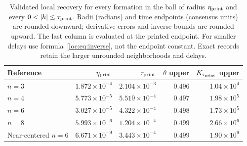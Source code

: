 \begin{table}[htbp]
\centering\small
\setlength{\tabcolsep}{5pt}
\begin{tabular}{lrrrr}
\toprule
Reference & $\eta_{\rm print}$ & $\tau_{\rm print}$ & $\theta$ upper & $K_{\tau_{\rm print}}$ upper \\
\midrule
$n=3$ & $1.872\times10^{-4}$ & $2.104\times10^{-3}$ & $0.496$ & $1.04\times10^{4}$ \\
$n=4$ & $5.773\times10^{-5}$ & $5.519\times10^{-4}$ & $0.497$ & $1.98\times10^{5}$ \\
$n=6$ & $3.027\times10^{-5}$ & $4.322\times10^{-4}$ & $0.498$ & $1.73\times10^{5}$ \\
$n=8$ & $5.993\times10^{-6}$ & $1.204\times10^{-4}$ & $0.499$ & $2.66\times10^{6}$ \\
Near-centered $n=6$ & $6.671\times10^{-9}$ & $3.443\times10^{-4}$ & $0.499$ & $1.90\times10^{9}$ \\
\bottomrule
\end{tabular}
\caption{Validated local recovery for every formation in the ball of radius
$\eta_{\rm print}$ and every $0<|h|\le\tau_{\rm print}$. Radii (radians) and
time endpoints (consensus units) are rounded downward; derivative errors and
inverse bounds are rounded upward. The last column is evaluated at the
printed endpoint. For smaller delays use formula~\eqref{loc:eq:inverse},
not the endpoint constant. Exact records retain the larger unrounded
neighborhoods and delays.}
\label{tab:certificates}
\end{table}

